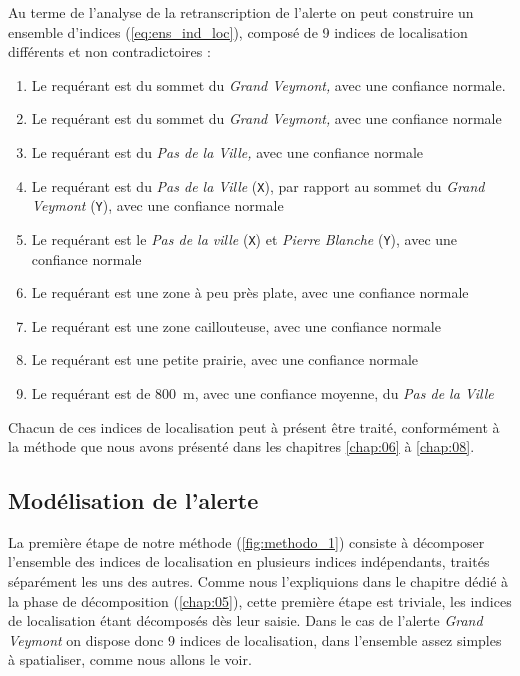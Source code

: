 Au terme de l'analyse de la retranscription de l'alerte on peut
construire un ensemble d'indices (\autoref{eq:ens_ind_loc}), composé
de 9 indices de localisation différents et non contradictoires :
% 
\begin{enumerate}
\item \label{ind:gv1} Le requérant est
   du sommet du \emph{Grand
    Veymont,} avec une confiance normale.
\item \label{ind:gv2} Le requérant est  du
  sommet du \emph{Grand Veymont,} avec une confiance normale
\item \label{ind:gv3} Le requérant est
   du \emph{Pas de la Ville,} avec
  une confiance normale
\item \label{ind:gv4} Le requérant est  du \emph{Pas de
    la Ville} (\texttt{X}), par rapport au sommet du \emph{Grand
    Veymont} (\texttt{Y}), avec une confiance normale
\item \label{ind:gv5} Le requérant est  le
  \emph{Pas de la ville} (\texttt{X}) et \emph{Pierre Blanche}
  (\texttt{Y}), avec une confiance normale
\item \label{ind:gv6} Le requérant est 
  une zone à peu près plate, avec une confiance normale
\item \label{ind:gv7} Le requérant est 
  une zone caillouteuse, avec une confiance normale
\item \label{ind:gv8} Le requérant est 
  une petite prairie, avec une confiance normale
\item \label{ind:gv9} Le requérant est
   de \SI{800}{\meter}, avec une
  confiance moyenne, du \emph{Pas de la Ville}
\end{enumerate}

Chacun de ces indices de localisation peut à présent être traité,
conformément à la méthode que nous avons présenté dans les chapitres
\ref{chap:06} à \ref{chap:08}.

\subsection{Modélisation de l'alerte}
\label{subsec:9-2-2}

La première étape de notre méthode (\autoref{fig:methodo_1}) consiste
à décomposer l'ensemble des indices de localisation en plusieurs
indices indépendants, traités séparément les uns des autres. Comme
nous l'expliquions dans le chapitre dédié à la phase de décomposition
(\autoref{chap:05}), cette première étape est triviale, les indices de
localisation étant décomposés dès leur saisie. Dans le cas de l'alerte
\emph{Grand Veymont} on dispose donc 9 indices de localisation, dans
l'ensemble assez simples à spatialiser, comme nous allons le voir.

